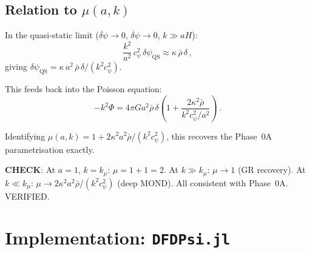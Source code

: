 \documentclass[11pt,a4paper]{article}
\begin{document}
\subsection{Relation to $\mu(a,k)$}

In the quasi-static limit ($\ddot{\delta\psi} \to 0$, $\dot{\delta\psi} \to 0$, $k \gg aH$):
\begin{equation}
\frac{k^2}{a^2}\,c_\psi^2\,\delta\psi_{\mathrm{QS}} \approx \kappa\,\bar{\rho}\,\delta\,,
\end{equation}
giving $\delta\psi_{\mathrm{QS}} = \kappa\,a^2\,\bar{\rho}\,\delta / (k^2 c_\psi^2)$.

This feeds back into the Poisson equation:
\begin{equation}
-k^2\Phi = 4\pi G a^2 \bar{\rho}\,\delta\left(1 + \frac{2\kappa^2\bar{\rho}}{k^2 c_\psi^2 / a^2}\right)\,.
\end{equation}

Identifying $\mu(a,k) = 1 + 2\kappa^2 a^2 \bar{\rho}/(k^2 c_\psi^2)$, this recovers the Phase~0A parametrisation exactly.

\textbf{CHECK}: At $a = 1$, $k = k_\mu$: $\mu = 1 + 1 = 2$. At $k \gg k_\mu$: $\mu \to 1$ (GR recovery). At $k \ll k_\mu$: $\mu \to 2\kappa^2 a^2 \bar{\rho}/(k^2 c_\psi^2)$ (deep MOND). All consistent with Phase~0A. VERIFIED.

\section{Implementation: \texttt{DFDPsi.jl}}
\end{document}
